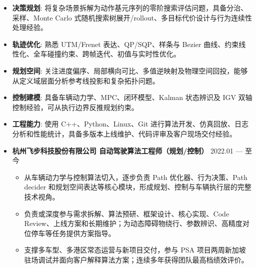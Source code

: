 \documentclass[zh]{resume}
\begin{document}
\makeheader

\begin{abstract}
四年多港口物流自动驾驶算法研发经验，工作覆盖行为决策、实时轨迹优化、规划空间表达、车辆动力学与控制建模。长期承担规划核心模块的方案设计、代码实现、评审上线与问题闭环，主导或核心参与低参考线依赖行为搜索评估框架、实时 QP Path 优化器及规划语义空间重构。方案服务集卡、IGV 等多车型和 PSA、梅山、甬舟等项目，典型线上 Path 求解保持 10\,ms 量级、成功率 99.88\%。具备从问题建模、数值优化到车辆可执行性和现场交付的跨层视角。
\end{abstract}

\begin{itemize}
  \item \textbf{决策规划}: 将复杂场景拆解为动作基元序列的零阶搜索评估问题，具备分治、采样、Monte Carlo 式随机搜索树展开/rollout、多目标代价设计与行为连续性处理经验。
  \item \textbf{轨迹优化}: 熟悉 UTM/Frenet 表达、QP/SQP、样条与 Bezier 曲线、约束线性化、全车碰撞约束、跨帧迭代、初值与实时性优化。
  \item \textbf{规划空间}: 关注进度偏序、局部横向可比、多值逆映射及物理空间回投，能够从定义域层面分析参考线投影和复杂拓扑问题。
  \item \textbf{控制建模}: 具备车辆动力学、MPC、闭环模型、Kalman 状态辨识及 IGV 双轴控制经验，可从执行边界反推规划约束。
  \item \textbf{工程能力}: 使用 C++、Python、Linux、Git 进行算法开发、仿真回放、日志分析和性能统计，具备多版本上线维护、代码评审及客户现场交付经验。
\end{itemize}

\begin{itemize}
  \item \textbf{杭州飞步科技股份有限公司 \quad 自动驾驶算法工程师（规划/控制）} \hfill 2022.01 --- 至今
  \begin{itemize}
    \item 从车辆动力学与控制算法切入，逐步负责 Path 优化器、行为决策、Path decider 和规划空间表达等核心模块，形成规划、控制与车辆执行层的完整技术视角。
    \item 负责或深度参与需求拆解、算法预研、框架设计、核心实现、Code Review、上线方案和长期维护；为动态障碍物绕行、参数辨识、高精度对位停车等任务提供方案指导。
    \item 支撑多车型、多港区常态运营与新项目交付，参与 PSA 项目两周新加坡驻场调试并面向客户解释算法方案；连续多年获得团队最高档绩效评价。
  \end{itemize}
\end{itemize}
\end{document}
